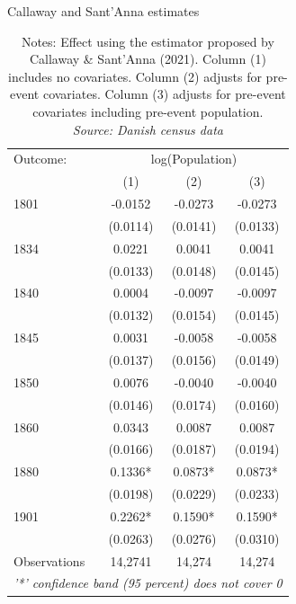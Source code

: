 \begin{table}[H]
\centering
\caption{Callaway and Sant'Anna estimates} \label{tab:cs_estimates}
\footnotesize
\begin{tabular}{lccc}
   \tabularnewline \midrule \midrule
   Outcome: & \multicolumn{3}{c}{log(Population)}\\
            & (1)           & (2)             & (3)\\  
   \midrule
    1801 & -0.0152      & -0.0273     & -0.0273 \\
         & (0.0114)     & (0.0141)    & (0.0133) \\
    1834 & 0.0221       & 0.0041      & 0.0041 \\
         & (0.0133)     & (0.0148)    & (0.0145) \\
    1840 & 0.0004       & -0.0097     & -0.0097 \\
         & (0.0132)     & (0.0154)    & (0.0145) \\
    1845 & 0.0031       & -0.0058     & -0.0058 \\
         & (0.0137)     & (0.0156)    & (0.0149) \\
    1850 & 0.0076       & -0.0040     & -0.0040 \\
         & (0.0146)     & (0.0174)    & (0.0160) \\
    1860 & 0.0343       & 0.0087      & 0.0087 \\
         & (0.0166)     & (0.0187)    & (0.0194) \\
    1880 & 0.1336*      & 0.0873*     & 0.0873* \\
         & (0.0198)     & (0.0229)    & (0.0233) \\
    1901 & 0.2262*      & 0.1590*     & 0.1590* \\
         & (0.0263)     & (0.0276)    & (0.0310)\\  
   \midrule
   Observations & 14,2741 & 14,274 & 14,274\\
   \midrule \midrule
   \multicolumn{4}{l}{\emph{'*' confidence band (95 percent) does not cover 0}}\\
\end{tabular}
\parbox{0.6\textwidth}{
\caption*{Notes: Effect using the estimator proposed by Callaway \& Sant’Anna (2021). Column (1) includes no covariates. Column (2) adjusts for pre-event covariates. Column (3) adjusts for pre-event covariates including pre-event population. \\ \textit{Source: Danish census data}}
}

\end{table}

